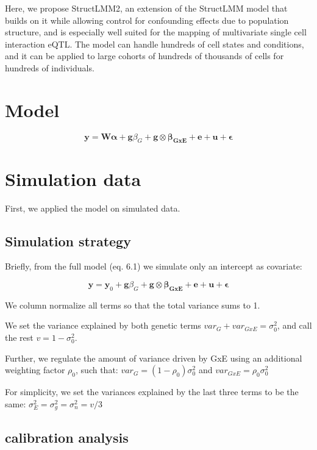 Here, we propose StructLMM2, an extension of the StructLMM model that builds on it while allowing control for confounding effects due to population structure, and is especially well suited for the mapping of multivariate single cell interaction eQTL. 
The model can handle hundreds of cell states and conditions, and it can be applied to large cohorts of hundreds of thousands of cells for hundreds of  individuals.


\section{Model} 

\begin{equation}
 \mathbf{y} =  \mathbf{W}\boldsymbol{\alpha} + \mathbf{g}\beta_G + \mathbf{g} \otimes \boldsymbol{\beta_{GxE}} + \mathbf{e} + \mathbf{u} + \boldsymbol{\epsilon} 
\end{equation}

\section{Simulation data}

First, we applied the model on simulated data.

\subsection{Simulation strategy}
Briefly, from the full model (eq. 6.1) we simulate only an intercept as covariate:  

\begin{equation}
 \mathbf{y} = \mathbf{y}_0 + \mathbf{g}\beta_G + \mathbf{g} \otimes \boldsymbol{\beta_{GxE}} + \mathbf{e} + \mathbf{u} + \boldsymbol{\epsilon} 
\end{equation}

We column normalize all terms so that the total variance sums to 1.

We set the variance explained by both genetic terms $var_G+var_{GxE}=\sigma_0^2$, and call the rest $v = 1-\sigma_0^2$.

Further, we regulate the amount of variance driven by GxE using an additional weighting factor $\rho_0$, such that: $var_G = (1-\rho_0)\sigma_0^2$ and $var_{GxE} = \rho_0\sigma_0^2$

For simplicity, we set the variances explained by the last three terms to be the same:
$\sigma_E^2 = \sigma_g^2 = \sigma_n^2 = v/3$

\subsection{calibration analysis}

